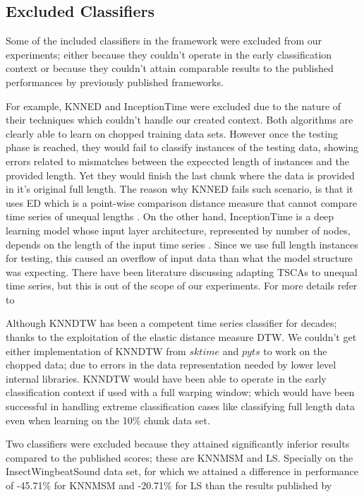 \subsection{Excluded Classifiers}
\label{SubsectionExcludedClassifiers}
Some of the included classifiers in the framework were excluded from our experiments; either because they couldn't operate in the early classification context
or because they couldn't attain comparable results to the published performances by previously published frameworks.

For example, KNNED and InceptionTime were excluded due to the nature of their techniques which couldn't handle our created context.
Both algorithms are clearly able to learn on chopped training data sets.
However once the testing phase is reached, they would fail to classify instances of the testing data,
showing errors related to mismatches between the expeccted length of instances and the provided length.
Yet they would finish the last chunk where the data is provided in it's original full length.
The reason why KNNED fails such scenario, is that it uses ED which is a point-wise comparison distance measure that cannot compare time series of unequal lengths \cite{tan2019time}.
On the other hand, InceptionTime is a deep learning model whose input layer architecture, represented by number of nodes, depends on the length of the input time series \cite{fawaz2019deepreview}.
Since we use full length instances for testing, this caused an overflow of input data than what the model structure was expecting.
There have been literature discussing adapting TSCAs to unequal time series, but this is out of the scope of our experiments.
For more details refer to \cite{caiado2009comparison, tan2019time, fawaz2019deepreview}


Although KNNDTW has been a competent time series classifier for decades; thanks to the exploitation of the elastic distance measure DTW.
We couldn't get either implementation of KNNDTW from $sktime$ and $pyts$ to work on the chopped data; due to errors in the data representation needed by lower level internal libraries.
KNNDTW would have been able to operate in the early classification context if used with a full warping window; which would have been successful in handling extreme classification cases like classifying full length data
even when learning on the 10\% chunk data set.


Two classifiers were excluded because they attained significantly inferior results compared to the published scores; these are KNNMSM and LS.
Specially on the InsectWingbeatSound data set, for which we attained a difference in performance of -45.71\% for KNNMSM and -20.71\% for LS than the results published by \cite{bagnall2017great}

